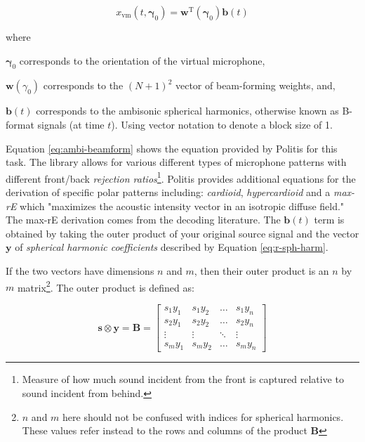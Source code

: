 \begin{equation}
x_{\mathrm{vm}}\left(t, \boldsymbol{\gamma}_{0}\right)=\mathbf{w}^{\mathrm{T}}\left(\boldsymbol{\gamma}_{0}\right) \mathbf{b}(t)
\label{eq:ambi-beamform}
\end{equation}

\noindent where
\begin{description}
\item  $\boldsymbol{\gamma}_{0}$ corresponds to the orientation of the virtual microphone,
\item  $\mathbf{w}(\gamma_{0})$ corresponds to the $(N+1)^{2}$ vector of beam-forming weights, and,
\item  $\mathbf{b}(t)$ corresponds to the ambisonic spherical harmonics, otherwise known as B-format signals (at time $t$). Using vector notation to denote a block size of 1.
\end{description}


Equation \ref{eq:ambi-beamform} shows the equation provided by Politis \cite{politis2016jsambisonics} for this task. The library allows for various different types of microphone patterns with different front/back \textit{rejection ratios}\footnote{Measure of how much sound incident from the front is captured relative to sound incident from behind.}. Politis \cite{politis2016jsambisonics} provides additional equations for the derivation of specific polar patterns including: \textit{cardioid}, \textit{hypercardioid} and a \textit{max-rE} which "maximizes the acoustic intensity vector in an isotropic diffuse field." The max-rE derivation comes from the decoding literature. The $\mathbf{b}(t)$ term is obtained by taking the outer product of your original source signal and the vector $\mathbf{y}$ of \textit{spherical harmonic coefficients} described by Equation \ref{eq:r-sph-harm}.

If the two vectors have dimensions $n$ and $m$, then their outer product is an $n$ by $m$ matrix\footnote{$n$ and $m$ here should not be confused with indices for spherical harmonics. These values refer instead to the rows and columns of the product $\mathbf{B}$}. The outer product is defined as: 

\begin{equation}
\mathbf{s} \otimes \mathbf{y}=\mathbf{B}=\left[\begin{array}{cccc}
s_{1} y_{1} & s_{1} y_{2} & \ldots & s_{1} y_{n} \\
s_{2} y_{1} & s_{2} y_{2} & \ldots & s_{2} y_{n} \\
\vdots & \vdots & \ddots & \vdots \\
s_{m} y_{1} & s_{m} y_{2} & \ldots & s_{m} y_{n}
\end{array}\right]
\end{equation}


